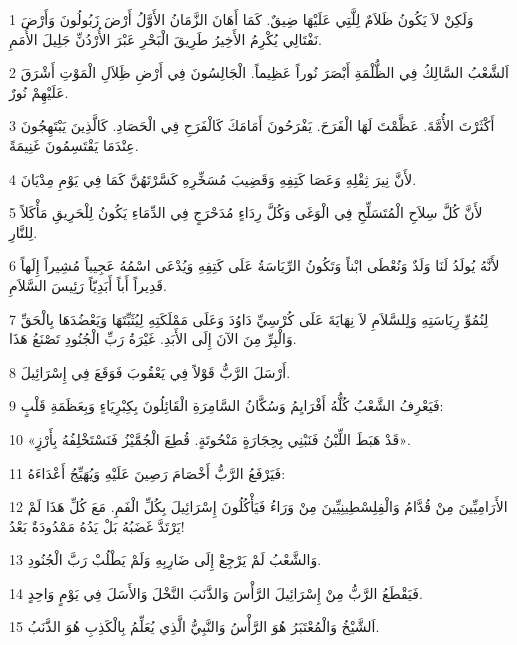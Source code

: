 \par 1 وَلَكِنْ لاَ يَكُونُ ظَلاَمٌ لِلَّتِي عَلَيْهَا ضِيقٌ. كَمَا أَهَانَ الزَّمَانُ الأَوَّلُ أَرْضَ زَبُولُونَ وَأَرْضَ نَفْتَالِي يُكْرِمُ الأَخِيرُ طَرِيقَ الْبَحْرِ عَبْرَ الأُرْدُنِّ جَلِيلَ الأُمَمِ.
\par 2 اَلشَّعْبُ السَّالِكُ فِي الظُّلْمَةِ أَبْصَرَ نُوراً عَظِيماً. الْجَالِسُونَ فِي أَرْضِ ظَِلاَلِ الْمَوْتِ أَشْرَقَ عَلَيْهِمْ نُورٌ.
\par 3 أَكْثَرْتَ الأُمَّةَ. عَظَّمْتَ لَهَا الْفَرَحَ. يَفْرَحُونَ أَمَامَكَ كَالْفَرَحِ فِي الْحَصَادِ. كَالَّذِينَ يَبْتَهِجُونَ عِنْدَمَا يَقْتَسِمُونَ غَنِيمَةً.
\par 4 لأَنَّ نِيرَ ثِقْلِهِ وَعَصَا كَتِفِهِ وَقَضِيبَ مُسَخِّرِهِ كَسَّرْتَهُنَّ كَمَا فِي يَوْمِ مِدْيَانَ.
\par 5 لأَنَّ كُلَّ سِلاَحِ الْمُتَسَلِّحِ فِي الْوَغَى وَكُلَّ رِدَاءٍ مُدَحْرَجٍ فِي الدِّمَاءِ يَكُونُ لِلْحَرِيقِ مَأْكَلاً لِلنَّارِ.
\par 6 لأَنَّهُ يُولَدُ لَنَا وَلَدٌ وَنُعْطَى ابْناً وَتَكُونُ الرِّيَاسَةُ عَلَى كَتِفِهِ وَيُدْعَى اسْمُهُ عَجِيباً مُشِيراً إِلَهاً قَدِيراً أَباً أَبَدِيّاً رَئِيسَ السَّلاَمِ.
\par 7 لِنُمُوِّ رِيَاسَتِهِ وَلِلسَّلاَمِ لاَ نِهَايَةَ عَلَى كُرْسِيِّ دَاوُدَ وَعَلَى مَمْلَكَتِهِ لِيُثَبِّتَهَا وَيَعْضُدَهَا بِالْحَقِّ وَالْبِرِّ مِنَ الآنَ إِلَى الأَبَدِ. غَيْرَةُ رَبِّ الْجُنُودِ تَصْنَعُ هَذَا.
\par 8 أَرْسَلَ الرَّبُّ قَوْلاً فِي يَعْقُوبَ فَوَقَعَ فِي إِسْرَائِيلَ.
\par 9 فَيَعْرِفُ الشَّعْبُ كُلُّهُ أَفْرَايِمُ وَسُكَّانُ السَّامِرَةِ الْقَائِلُونَ بِكِبْرِيَاءٍ وَبِعَظَمَةِ قَلْبٍ:
\par 10 «قَدْ هَبَطَ اللِّبْنُ فَنَبْنِي بِحِجَارَةٍ مَنْحُوتَةٍ. قُطِعَ الْجُمَّيْزُ فَنَسْتَخْلِفُهُ بِأَرْزٍ».
\par 11 فَيَرْفَعُ الرَّبُّ أَخْصَامَ رَصِينَ عَلَيْهِ وَيُهَيِّجُ أَعْدَاءَهُ:
\par 12 الأَرَامِيِّينَ مِنْ قُدَّامُ وَالْفِلِسْطِينِيِّينَ مِنْ وَرَاءُ فَيَأْكُلُونَ إِسْرَائِيلَ بِكُلِّ الْفَمِ. مَعَ كُلِّ هَذَا لَمْ يَرْتَدَّ غَضَبُهُ بَلْ يَدُهُ مَمْدُودَةٌ بَعْدُ!
\par 13 وَالشَّعْبُ لَمْ يَرْجِعْ إِلَى ضَارِبِهِ وَلَمْ يَطْلُبْ رَبَّ الْجُنُودِ.
\par 14 فَيَقْطَعُ الرَّبُّ مِنْ إِسْرَائِيلَ الرَّأْسَ وَالذَّنَبَ النَّخْلَ وَالأَسَلَ فِي يَوْمٍ وَاحِدٍ.
\par 15 اَلشَّيْخُ وَالْمُعْتَبَرُ هُوَ الرَّأْسُ وَالنَّبِيُّ الَّذِي يُعَلِّمُ بِالْكَذِبِ هُوَ الذَّنَبُ.
